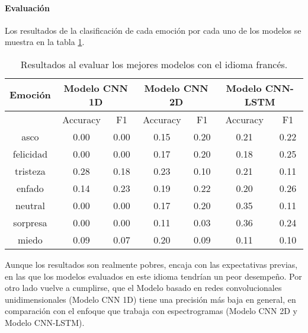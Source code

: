 \documentclass[11pt,a4paper,spanish]{book}
\begin{document}
	\paragraph{Evaluación}
	Los resultados de la clasificación de cada emoción por cada uno de los modelos se muestra en la tabla \ref{results_TestFrench}.
	
	\begin{table}[H]
		\centering
		\begin{center}
			\begin{tabular}{| c|| c c |  c c |  c c | }
				\hline
				\multicolumn{1}{|c||}{Emoción} & 
				\multicolumn{2}{|c|}{Modelo CNN 1D}&
				\multicolumn{2}{|c|}{Modelo CNN 2D} &
				\multicolumn{2}{|c|}{Modelo CNN-LSTM} \\
				
				\hline
				& 
				\multicolumn{1}{|c|}{Accuracy}&\multicolumn{1}{|c|}{F1}&
				\multicolumn{1}{|c|}{Accuracy}&\multicolumn{1}{|c|}{F1}&
				\multicolumn{1}{|c|}{Accuracy}&\multicolumn{1}{|c|}{F1}\\
				\hline
				
				asco 		& 0.00 & 0.00 & 0.15 & 0.20 & 0.21 & 0.22\\
				felicidad 	& 0.00 & 0.00 & 0.17 & 0.20 & 0.18 & 0.25 \\
				tristeza 	& 0.28 & 0.18 & 0.23 & 0.10 & 0.21 & 0.11 \\
				enfado 		& 0.14 & 0.23 & 0.19 & 0.22 & 0.20 & 0.26 \\
				neutral 	& 0.00 & 0.00 & 0.17 & 0.20 & 0.35 & 0.11 \\
				sorpresa 	& 0.00 & 0.00 & 0.11 & 0.03 & 0.36 & 0.24 \\
				miedo 		& 0.09 & 0.07 & 0.20 & 0.09 & 0.11 & 0.10 \\
				\hline
			\end{tabular}
			
			\caption{Resultados al evaluar los mejores modelos con el idioma francés.}
			\label{results_TestFrench}
		\end{center}
	\end{table}

	Aunque los resultados son realmente pobres, encaja con las expectativas previas, en las que los modelos evaluados en este idioma tendrían un peor desempeño. Por otro lado vuelve a cumplirse, que el Modelo basado en redes convolucionales unidimensionales (Modelo CNN 1D) tiene una precisión más baja en general, en comparación con el enfoque que trabaja con espectrogramas (Modelo CNN 2D y Modelo CNN-LSTM). 


		
		
		
		
		
		
		

	\printbibliography
	
\end{document}
